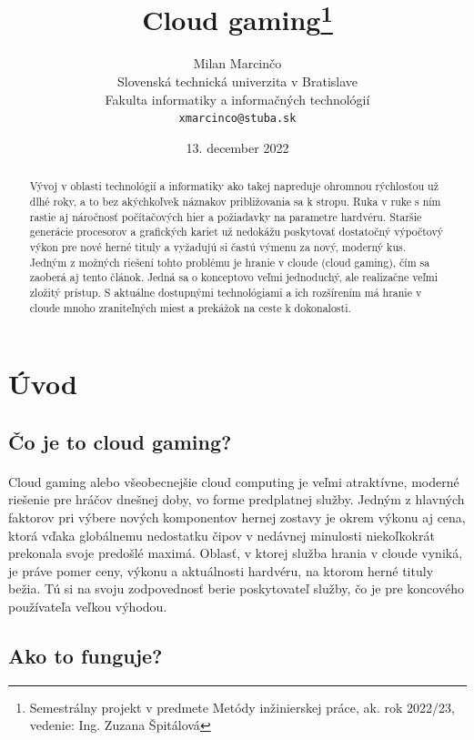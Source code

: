 \documentclass[10pt,twoside,slovak,a4paper]{article}
\title{Cloud gaming\thanks{Semestrálny projekt v predmete Metódy inžinierskej práce, ak. rok 2022/23, vedenie: Ing. Zuzana Špitálová}}
\author{Milan Marcinčo\\[2pt]
	{\small Slovenská technická univerzita v Bratislave}\\
	{\small Fakulta informatiky a informačných technológií}\\
	{\small \texttt{xmarcinco@stuba.sk}}
	}
\date{\small 13. december 2022}
\begin{document}
\maketitle

\begin{abstract}
Vývoj v oblasti technológií a informatiky ako takej napreduje ohromnou rýchlosťou už dlhé roky, a to bez akýchkoľvek náznakov približovania sa k stropu. Ruka v ruke s ním rastie aj náročnosť počítačových hier a požiadavky na parametre hardvéru. Staršie generácie procesorov a grafických kariet už nedokážu poskytovať dostatočný výpočtový výkon pre nové herné tituly a vyžadujú si častú výmenu za nový, moderný kus. Jedným z možných riešení tohto problému je hranie v cloude (cloud gaming), čím sa zaoberá aj tento článok. Jedná sa o konceptovo veľmi jednoduchý, ale realizačne veľmi zložitý prístup. S aktuálne dostupnými technológiami a ich rozšírením má hranie v cloude mnoho zraniteľných miest a prekážok na ceste k dokonalosti.
\end{abstract}



\section{Úvod}

\subsection{Čo je to cloud gaming?}

\paragraph{} Cloud gaming alebo všeobecnejšie cloud computing je veľmi atraktívne, moderné riešenie pre hráčov dnešnej doby, vo forme predplatnej služby. Jedným z hlavných faktorov pri výbere nových komponentov hernej zostavy je okrem výkonu aj cena, ktorá vďaka globálnemu nedostatku čipov v nedávnej minulosti niekoľkokrát prekonala svoje predošlé maximá. Oblasť, v ktorej služba hrania v cloude vyniká, je práve pomer ceny, výkonu a aktuálnosti hardvéru, na ktorom herné tituly bežia. Tú si na svoju zodpovednosť berie poskytovateľ služby, čo je pre koncového používateľa veľkou výhodou.



\subsection{Ako to funguje?}
\end{document}
